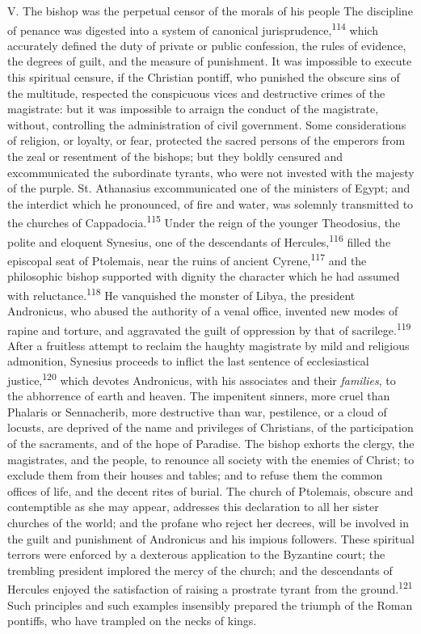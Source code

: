 V. The bishop was the perpetual censor of the morals of his people The
discipline of penance was digested into a system of canonical
jurisprudence,\textsuperscript{114} which accurately defined the duty of private or
public confession, the rules of evidence, the degrees of guilt, and the
measure of punishment. It was impossible to execute this spiritual
censure, if the Christian pontiff, who punished the obscure sins of the
multitude, respected the conspicuous vices and destructive crimes of
the magistrate: but it was impossible to arraign the conduct of the
magistrate, without, controlling the administration of civil
government. Some considerations of religion, or loyalty, or fear,
protected the sacred persons of the emperors from the zeal or
resentment of the bishops; but they boldly censured and excommunicated
the subordinate tyrants, who were not invested with the majesty of the
purple. St. Athanasius excommunicated one of the ministers of Egypt;
and the interdict which he pronounced, of fire and water, was solemnly
transmitted to the churches of Cappadocia.\textsuperscript{115} Under the reign of the
younger Theodosius, the polite and eloquent Synesius, one of the
descendants of Hercules,\textsuperscript{116} filled the episcopal seat of Ptolemais,
near the ruins of ancient Cyrene,\textsuperscript{117} and the philosophic bishop
supported with dignity the character which he had assumed with
reluctance.\textsuperscript{118} He vanquished the monster of Libya, the president
Andronicus, who abused the authority of a venal office, invented new
modes of rapine and torture, and aggravated the guilt of oppression by
that of sacrilege.\textsuperscript{119} After a fruitless attempt to reclaim the haughty
magistrate by mild and religious admonition, Synesius proceeds to
inflict the last sentence of ecclesiastical justice,\textsuperscript{120} which devotes
Andronicus, with his associates and their \textit{families}, to the abhorrence
of earth and heaven. The impenitent sinners, more cruel than Phalaris
or Sennacherib, more destructive than war, pestilence, or a cloud of
locusts, are deprived of the name and privileges of Christians, of the
participation of the sacraments, and of the hope of Paradise. The
bishop exhorts the clergy, the magistrates, and the people, to renounce
all society with the enemies of Christ; to exclude them from their
houses and tables; and to refuse them the common offices of life, and
the decent rites of burial. The church of Ptolemais, obscure and
contemptible as she may appear, addresses this declaration to all her
sister churches of the world; and the profane who reject her decrees,
will be involved in the guilt and punishment of Andronicus and his
impious followers. These spiritual terrors were enforced by a dexterous
application to the Byzantine court; the trembling president implored
the mercy of the church; and the descendants of Hercules enjoyed the
satisfaction of raising a prostrate tyrant from the ground.\textsuperscript{121} Such
principles and such examples insensibly prepared the triumph of the
Roman pontiffs, who have trampled on the necks of kings.

